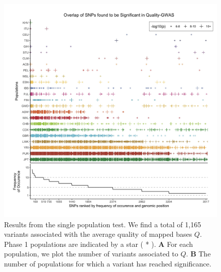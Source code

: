 \documentclass[9pt,article]{template}
\begin{document}
\begin{figure}
\includegraphics[width=\hsize,keepaspectratio]{SNPOverlap6.jpg}

\caption{Results from the single population test. We find a total of 1,165 variants associated with the average quality of mapped bases $Q$.
Phase 1 populations are indicated by a star ( * ).
\textbf{A} For each population, we plot the number of variants associated to $Q$.
\textbf{B} The number of populations for which a variant has reached significance.}
  \label{OverLap}
\end{figure}
\end{document}
